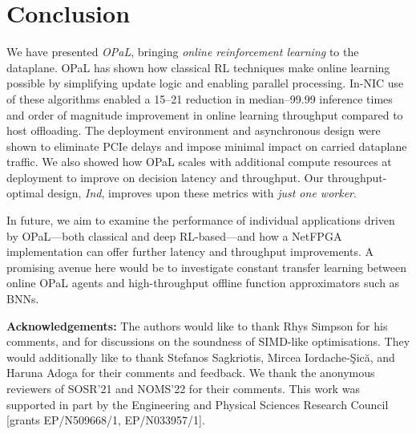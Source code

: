 \documentclass[
conference
,10pt
]{IEEEtran}
\newcommand{\fakepara}[1]{\noindent\textbf{#1:}}
\newcommand{\approachshort}{OPaL}
\newcommand{\Indfw}{\emph{Ind}}
\begin{document}
\section{Conclusion}
We have presented \emph{\approachshort{}}, bringing \emph{online reinforcement learning} to the dataplane.
\approachshort{} has shown how classical RL techniques make online learning possible by simplifying update logic and enabling parallel processing.
In-NIC use of these algorithms enabled a \SIrange{15}{21}{\texttimes} reduction in median--\num{99.99} inference times and order of magnitude improvement in online learning throughput compared to host offloading.
The deployment environment and asynchronous design were shown to eliminate PCIe delays and impose minimal impact on carried dataplane traffic.
We also showed how \approachshort{} scales with additional compute resources at deployment to improve on decision latency and throughput.
Our throughput-optimal design, \Indfw{}, improves upon these metrics with \emph{just one worker}.

In future, we aim to examine the performance of individual applications driven by \approachshort---both classical and deep RL-based---and how a NetFPGA implementation can offer further latency and throughput improvements.
A promising avenue here would be to investigate constant transfer learning between online \approachshort{} agents and high-throughput offline function approximators such as BNNs.

\fakepara{Acknowledgements}
The authors would like to thank Rhys Simpson for his comments, and for discussions on the soundness of SIMD-like optimisations.
They would additionally like to thank Stefanos Sagkriotis, Mircea Iordache-\c{S}ic\u{a}, and Haruna Adoga for their comments and feedback.
We thank the anonymous reviewers of SOSR'21 and NOMS'22 for their comments.
This work was supported in part by the Engineering and Physical Sciences Research Council [grants EP/N509668/1, EP/N033957/1].
	
%
%

\clearpage

\printbibliography
\end{document}
